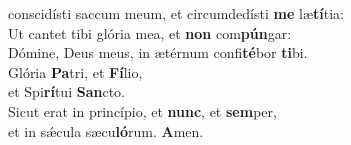 \evenverse conscidísti saccum meum, et circumdedísti \textbf{me} læ\textbf{tí}tia:\\
\oddverse Ut cantet tibi glória mea, et \textbf{non} com\textbf{pún}gar:~\*\\
\oddverse Dómine, Deus meus, in ætérnum confi\textbf{té}bor \textbf{ti}bi.\\
\evenverse Glória \textbf{Pa}tri, et \textbf{Fí}lio,~\*\\
\evenverse et Spi\textbf{rí}tui \textbf{San}cto.\\
\oddverse Sicut erat in princípio, et \textbf{nunc}, et \textbf{sem}per,~\*\\
\oddverse et in sǽcula sæcu\textbf{ló}rum. \textbf{A}men.\\
